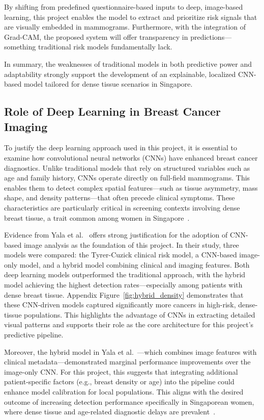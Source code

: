 \documentclass[12pt]{article}
\begin{document}
By shifting from predefined questionnaire-based inputs to deep, image-based learning, this project enables the model to extract and prioritize risk signals that are visually embedded in mammograms. Furthermore, with the integration of Grad-CAM, the proposed system will offer transparency in predictions—something traditional risk models fundamentally lack.

In summary, the weaknesses of traditional models in both predictive power and adaptability strongly support the development of an explainable, localized CNN-based model tailored for dense tissue scenarios in Singapore.

\subsection{Role of Deep Learning in Breast Cancer Imaging}

To justify the deep learning approach used in this project, it is essential to examine how convolutional neural networks (CNNs) have enhanced breast cancer diagnostics. Unlike traditional models that rely on structured variables such as age and family history, CNNs operate directly on full-field mammograms. This enables them to detect complex spatial features—such as tissue asymmetry, mass shape, and density patterns—that often precede clinical symptoms. These characteristics are particularly critical in screening contexts involving dense breast tissue, a trait common among women in Singapore~\cite{6}.

Evidence from Yala et al.~\cite{1} offers strong justification for the adoption of CNN-based image analysis as the foundation of this project. In their study, three models were compared: the Tyrer-Cuzick clinical risk model, a CNN-based image-only model, and a hybrid model combining clinical and imaging features. Both deep learning models outperformed the traditional approach, with the hybrid model achieving the highest detection rates—especially among patients with dense breast tissue. Appendix Figure~\ref{fig:hybrid_density} demonstrates that these CNN-driven models captured significantly more cancers in high-risk, dense-tissue populations. This highlights the advantage of CNNs in extracting detailed visual patterns and supports their role as the core architecture for this project’s predictive pipeline.

Moreover, the hybrid model in Yala et al.~\cite{1}—which combines image features with clinical metadata—demonstrated marginal performance improvements over the image-only CNN. For this project, this suggests that integrating additional patient-specific factors (e.g., breast density or age) into the pipeline could enhance model calibration for local populations. This aligns with the desired outcome of increasing detection performance specifically in Singaporean women, where dense tissue and age-related diagnostic delays are prevalent~\cite{6,10}.
\end{document}
